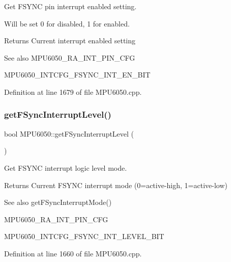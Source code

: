 Get F\+S\+Y\+NC pin interrupt enabled setting. 

Will be set 0 for disabled, 1 for enabled. \begin{DoxyReturn}{Returns}
Current interrupt enabled setting 
\end{DoxyReturn}
\begin{DoxySeeAlso}{See also}
M\+P\+U6050\+\_\+\+R\+A\+\_\+\+I\+N\+T\+\_\+\+P\+I\+N\+\_\+\+C\+FG 

M\+P\+U6050\+\_\+\+I\+N\+T\+C\+F\+G\+\_\+\+F\+S\+Y\+N\+C\+\_\+\+I\+N\+T\+\_\+\+E\+N\+\_\+\+B\+IT 
\end{DoxySeeAlso}


Definition at line 1679 of file M\+P\+U6050.\+cpp.

\mbox{\label{classMPU6050_a60fc85d4f27f99d07ffb9543d5e5f347}} 
\subsubsection{\texorpdfstring{getFSyncInterruptLevel()}{getFSyncInterruptLevel()}}
{\footnotesize\ttfamily bool M\+P\+U6050\+::get\+F\+Sync\+Interrupt\+Level (\begin{DoxyParamCaption}{ }\end{DoxyParamCaption})}



Get F\+S\+Y\+NC interrupt logic level mode. 

\begin{DoxyReturn}{Returns}
Current F\+S\+Y\+NC interrupt mode (0=active-\/high, 1=active-\/low) 
\end{DoxyReturn}
\begin{DoxySeeAlso}{See also}
get\+F\+Sync\+Interrupt\+Mode() 

M\+P\+U6050\+\_\+\+R\+A\+\_\+\+I\+N\+T\+\_\+\+P\+I\+N\+\_\+\+C\+FG 

M\+P\+U6050\+\_\+\+I\+N\+T\+C\+F\+G\+\_\+\+F\+S\+Y\+N\+C\+\_\+\+I\+N\+T\+\_\+\+L\+E\+V\+E\+L\+\_\+\+B\+IT 
\end{DoxySeeAlso}


Definition at line 1660 of file M\+P\+U6050.\+cpp.

\mbox{\label{classMPU6050_a0fe2dad60c170cee7d614e08f243ffd0}} 

